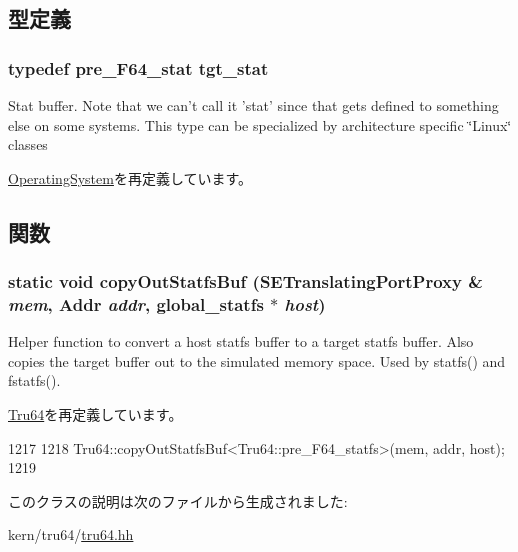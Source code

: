 \subsection{型定義}
\hypertarget{classTru64__PreF64_a704fbfa7adb0a1c876af25fc5367ccac}{
\subsubsection[{tgt\_\-stat}]{\setlength{\rightskip}{0pt plus 5cm}typedef {\bf pre\_\-F64\_\-stat} {\bf tgt\_\-stat}}}
\label{classTru64__PreF64_a704fbfa7adb0a1c876af25fc5367ccac}
Stat buffer. Note that we can't call it 'stat' since that gets defined to something else on some systems. This type can be specialized by architecture specific \char`\"{}Linux\char`\"{} classes 

\hyperlink{classOperatingSystem_a2b1f8be68cdf9781efbaf6e9cdbd8d02}{OperatingSystem}を再定義しています。

\subsection{関数}
\hypertarget{classTru64__PreF64_ab39f4973592abe61638b8b998bc5691d}{
\subsubsection[{copyOutStatfsBuf}]{\setlength{\rightskip}{0pt plus 5cm}static void copyOutStatfsBuf ({\bf SETranslatingPortProxy} \& {\em mem}, \/  {\bf Addr} {\em addr}, \/  {\bf global\_\-statfs} $\ast$ {\em host})}}
\label{classTru64__PreF64_ab39f4973592abe61638b8b998bc5691d}
Helper function to convert a host statfs buffer to a target statfs buffer. Also copies the target buffer out to the simulated memory space. Used by statfs() and fstatfs(). 

\hyperlink{classTru64_ab39f4973592abe61638b8b998bc5691d}{Tru64}を再定義しています。


\begin{DoxyCode}
1217     {
1218         Tru64::copyOutStatfsBuf<Tru64::pre_F64_statfs>(mem, addr, host);
1219     }
\end{DoxyCode}


このクラスの説明は次のファイルから生成されました:\begin{DoxyCompactItemize}
\item 
kern/tru64/\hyperlink{kern_2tru64_2tru64_8hh}{tru64.hh}\end{DoxyCompactItemize}
